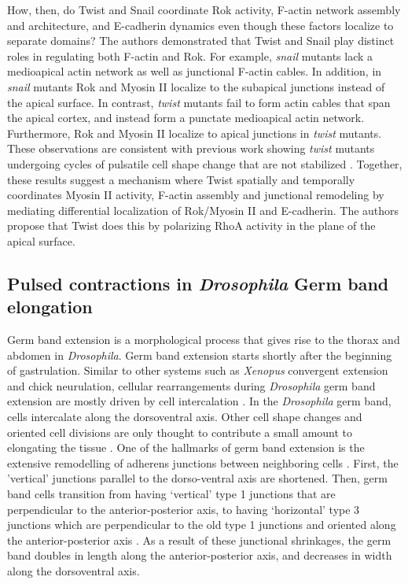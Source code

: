 \documentclass{ucetd}
\begin{document}
How, then, do Twist and Snail coordinate Rok activity, F-actin network assembly and architecture, and E-cadherin dynamics even though these factors localize to separate domains?  The authors demonstrated that Twist and Snail play distinct roles in regulating both F-actin and Rok.  For example, \textit{snail} mutants lack a medioapical actin network as well as junctional F-actin cables.  In addition, in \textit{snail} mutants Rok and Myosin II localize to the subapical junctions instead of the apical surface.  In contrast, \textit{twist} mutants fail to form actin cables that span the apical cortex, and instead form a punctate medioapical actin network.  Furthermore, Rok and Myosin II localize to apical junctions in \textit{twist} mutants.  These observations are consistent with previous work showing \textit{twist} mutants undergoing cycles of pulsatile cell shape change that are not stabilized \cite{Martin:2009du}.  Together, these results suggest a mechanism where Twist spatially and temporally coordinates Myosin II activity, F-actin assembly and junctional remodeling by mediating differential localization of Rok/Myosin II and E-cadherin.  The authors propose that Twist does this by polarizing RhoA activity in the plane of the apical surface.





\subsection{Pulsed contractions in \textit{Drosophila} Germ band elongation}
Germ band extension is a morphological process that gives rise to the thorax and abdomen in \textit{Drosophila}.  Germ band extension starts shortly after the beginning of gastrulation.   Similar to other systems such as \textit{Xenopus} convergent extension and chick neurulation, cellular rearrangements during \textit{Drosophila} germ band extension are mostly driven by cell intercalation \cite{Irvine:1994ug}.  In the \textit{Drosophila} germ band, cells intercalate along the dorsoventral axis.  Other cell shape changes and oriented cell divisions are only thought to contribute a small amount to elongating the tissue \cite{daSilva:2007er}.  One of the hallmarks of germ band extension is the extensive remodelling of adherens junctions between neighboring cells \cite{Bertet:2004ch}.  First, the 'vertical' junctions parallel to the dorso-ventral axis are shortened.  Then, germ band cells transition from having ‘vertical’ type 1 junctions that are perpendicular to the anterior-posterior axis, to having ‘horizontal’ type 3 junctions which are perpendicular to the old type 1 junctions and oriented along the anterior-posterior axis \cite{Bertet:2004ch}.  As a result of these junctional shrinkages, the germ band doubles in length along the anterior-posterior axis, and decreases in width along the dorsoventral axis.
\end{document}
